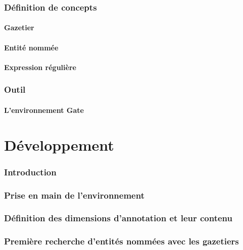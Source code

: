 \documentclass[a4paper, 11pt]{report}
\begin{document}
	\section{Définition de concepts}
	
		\subsection{Gazetier}
		
		\subsection{Entité nommée}
		
		\subsection{Expression régulière}
		
	\section{Outil}
	
		\subsection{L'environnement Gate}
		



\part{Développement}
	\section*{Introduction}
	
	\section{Prise en main de l'environnement}

	\section{Définition des dimensions d'annotation et leur contenu}

	\section{Première recherche d'entités nommées avec les gazetiers}
\end{document}
